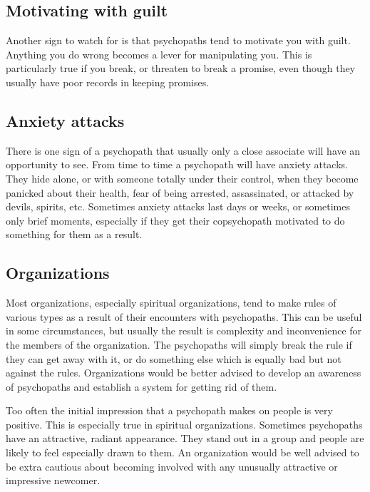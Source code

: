 \documentclass[a5paper,10pt,english]{book}
\begin{document}
\subsection{Motivating with guilt}
\label{\detokenize{psychopaths:motivating-with-guilt}}
\sphinxAtStartPar
Another sign to watch for is that psychopaths tend to motivate you with
guilt. Anything you do wrong becomes a lever for manipulating you. This
is particularly true if you break, or threaten to break a promise, even
though they usually have poor records in keeping promises.


\subsection{Anxiety attacks}
\label{\detokenize{psychopaths:anxiety-attacks}}
\sphinxAtStartPar
There is one sign of a psychopath that usually only a close associate
will have an opportunity to see. From time to time a psychopath will
have anxiety attacks. They hide alone, or with someone totally under
their control, when they become panicked about their health, fear of
being arrested, assassinated, or attacked by devils, spirits, etc.
Sometimes anxiety attacks last days or weeks, or sometimes only brief
moments, especially if they get their co\sphinxhyphen{}psychopath motivated to do
something for them as a result.


\subsection{Organizations}
\label{\detokenize{psychopaths:organizations}}
\sphinxAtStartPar
Most organizations, especially spiritual organizations, tend to make
rules of various types as a result of their encounters with psychopaths.
This can be useful in some circumstances, but usually the result is
complexity and inconvenience for the members of the organization. The
psychopaths will simply break the rule if they can get away with it, or
do something else which is equally bad but not against the rules.
Organizations would be better advised to develop an awareness of
psychopaths and establish a system for getting rid of them.

\sphinxAtStartPar
Too often the initial impression that a psychopath makes on people is
very positive. This is especially true in spiritual organizations.
Sometimes psychopaths have an attractive, radiant appearance. They stand
out in a group and people are likely to feel especially drawn to them.
An organization would be well advised to be extra cautious about
becoming involved with any unusually attractive or impressive newcomer.
\end{document}
